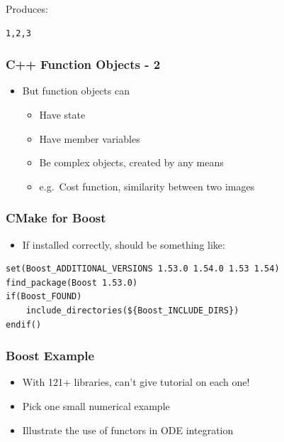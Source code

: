 Produces:

\begin{verbatim}
1,2,3
\end{verbatim}

\subsubsection{C++ Function Objects - 2}\label{c-function-objects---2}

\begin{itemize}
\itemsep1pt\parskip0pt
\item
  But function objects can

  \begin{itemize}
  \itemsep1pt\parskip0pt
  \item
    Have state
  \item
    Have member variables
  \item
    Be complex objects, created by any means
  \item
    e.g.~Cost function, similarity between two images
  \end{itemize}
\end{itemize}

\subsubsection{CMake for Boost}\label{cmake-for-boost}

\begin{itemize}
\itemsep1pt\parskip0pt
\item
  If installed correctly, should be something like:
\end{itemize}

\begin{verbatim}
set(Boost_ADDITIONAL_VERSIONS 1.53.0 1.54.0 1.53 1.54)
find_package(Boost 1.53.0)
if(Boost_FOUND)
    include_directories(${Boost_INCLUDE_DIRS})
endif()
\end{verbatim}

\subsubsection{Boost Example}\label{boost-example}

\begin{itemize}
\itemsep1pt\parskip0pt
\item
  With 121+ libraries, can't give tutorial on each one!
\item
  Pick one small numerical example
\item
  Illustrate the use of functors in ODE integration
\end{itemize}

